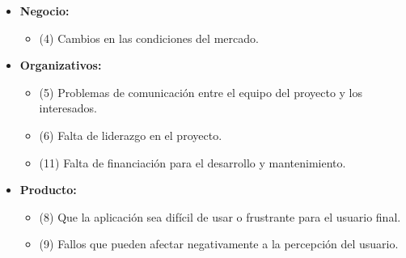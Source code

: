 \begin{solucion}[title=Solucion (2)]
    \begin{itemize}
        \item \textbf{Negocio:}
        \begin{itemize}
            \item (4) Cambios en las condiciones del mercado.
        \end{itemize}

        \item \textbf{Organizativos:}
        \begin{itemize}
            \item (5) Problemas de comunicación entre el equipo del proyecto y los interesados.
            \item (6) Falta de liderazgo en el proyecto.
            \item (11) Falta de financiación para el desarrollo y mantenimiento.
        \end{itemize}

        \item \textbf{Producto:}
        \begin{itemize}
            \item (8) Que la aplicación sea difícil de usar o frustrante para el usuario final.
            \item (9) Fallos que pueden afectar negativamente a la percepción del usuario.
        \end{itemize}

    \end{itemize}

\end{solucion}